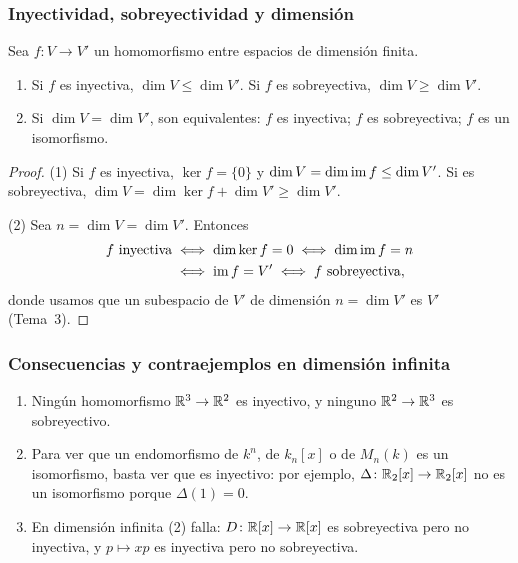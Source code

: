\begin{frame}
    \frametitle{Inyectividad, sobreyectividad y dimensión}

    \begin{corollary}
        Sea $f\colon V\to V'$ un homomorfismo entre espacios de dimensión
        finita.
        \begin{enumerate}[(1)]
            \item Si $f$ es inyectiva, $\dim V\leq\dim V'$. Si $f$ es
            sobreyectiva, $\dim V\geq\dim V'$.
            \item Si $\dim V=\dim V'$, son equivalentes: $f$ es
            inyectiva; $f$ es sobreyectiva; $f$ es un isomorfismo.
        \end{enumerate}
    \end{corollary}

    \begin{proof}
        \alert{(1)} Si $f$ es inyectiva, $\ker f=\{0\}$ y
        $\dim V=\dim\operatorname{im} f\leq\dim V'$. Si es sobreyectiva,
        $\dim V=\dim\ker f+\dim V'\geq\dim V'$.

        \alert{(2)} Sea $n=\dim V=\dim V'$. Entonces
        \begin{align*}
            f\text{ inyectiva}&\iff\dim\ker f=0\iff\dim\operatorname{im} f=n\\
            &\iff\operatorname{im} f=V'\iff f\text{ sobreyectiva},
        \end{align*}
        donde usamos que un subespacio de $V'$ de dimensión $n=\dim V'$
        es $V'$ (Tema~3).
    \end{proof}
\end{frame}


\begin{frame}
    \frametitle{Consecuencias y contraejemplos en dimensión infinita}

    \begin{example}
        \begin{enumerate}
            \item Ningún homomorfismo $\mathbb{R}^3\to\mathbb{R}^2$ es inyectivo, y ninguno
            $\mathbb{R}^2\to\mathbb{R}^3$ es sobreyectivo.
            \item Para ver que un endomorfismo de $k^n$, de $k_n[x]$ o de
            $M_n(k)$ es un isomorfismo, \alert{basta} ver que es
            inyectivo: por ejemplo, $\Delta\colon\mathbb{R}_2[x]\to\mathbb{R}_2[x]$ no es
            un isomorfismo porque $\Delta(1)=0$.
            \item En dimensión infinita (2) \alert{falla}:
            $D\colon\mathbb{R}[x]\to\mathbb{R}[x]$ es sobreyectiva pero no inyectiva, y
            $p\mapsto xp$ es inyectiva pero no sobreyectiva.
        \end{enumerate}
    \end{example}
\end{frame}


